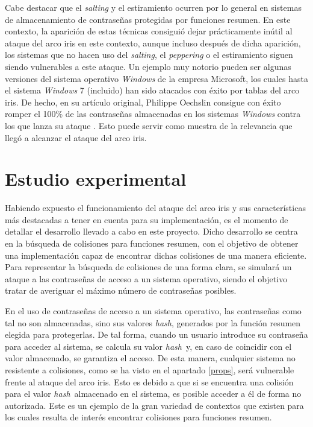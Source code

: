 \documentclass[12pt,spanish,listoffigures,listoftables,listofalgorithms]{tfgetsinf}
\newcommand{\hash}{\textit{hash}}
\begin{document}
Cabe destacar que el \textit{salting} y el estiramiento ocurren por lo general en sistemas de almacenamiento de contraseñas protegidas por funciones resumen. En este contexto, la aparición de estas técnicas consiguió dejar prácticamente inútil al ataque del arco iris en este contexto, aunque incluso después de dicha aparición, los sistemas que no hacen uso del \textit{salting}, el \textit{peppering} o el estiramiento siguen siendo vulnerables a este ataque. Un ejemplo muy notorio pueden ser algunas versiones del sistema operativo \textit{Windows} de la empresa Microsoft, los cuales hasta el sistema \textit{Windows} 7 (incluido) han sido atacados con éxito por tablas del arco iris. De hecho, en su artículo original, Philippe Oechslin consigue con éxito romper el 100\% de las contraseñas almacenadas en los sistemas \textit{Windows} contra los que lanza su ataque \cite{rainbow}. Esto puede servir como muestra de la relevancia que llegó a alcanzar el ataque del arco iris.

\chapter{Estudio experimental}

Habiendo expuesto el funcionamiento del ataque del arco iris y sus características más destacadas a tener en cuenta para su implementación, es el momento de detallar el desarrollo llevado a cabo en este proyecto. Dicho desarrollo se centra en la búsqueda de colisiones para funciones resumen, con el objetivo de obtener una implementación capaz de encontrar dichas colisiones de una manera eficiente. Para representar la búsqueda de colisiones de una forma clara, se simulará un ataque a las contraseñas de acceso a un sistema operativo, siendo el objetivo tratar de averiguar el máximo número de contraseñas posibles.

En el uso de contraseñas de acceso a un sistema operativo, las contraseñas como tal no son almacenadas, sino sus valores \hash, generados por la función resumen elegida para protegerlas. De tal forma, cuando un usuario introduce su contraseña para acceder al sistema, se calcula su valor \hash~y, en caso de coincidir con el valor almacenado, se garantiza el acceso. De esta manera, cualquier sistema no resistente a colisiones, como se ha visto en el apartado \ref{props}, será vulnerable frente al ataque del arco iris. Esto es debido a que si se encuentra una colisión para el valor \hash~almacenado en el sistema, es posible acceder a él de forma no autorizada. Este es un ejemplo de la gran variedad de contextos que existen para los cuales resulta de interés encontrar colisiones para funciones resumen.
\end{document}

